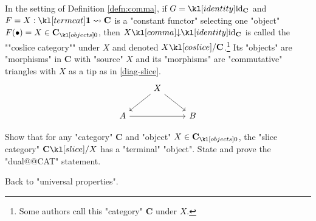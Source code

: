 \documentclass[main.tex]{subfiles}
\begin{document}
\begin{defn}
    In the setting of Definition \ref{defn:comma}, if $G = \id_{\mathbf{C}}$ and $F= X: \termcat \rightsquigarrow \mathbf{C}$ is a "constant functor" selecting one "object" $F(\bullet) = X \in \obj{\mathbf{C}}$, then $\comcat{X}{\id_{\mathbf{C}}}$ is called the ""coslice category"" under $X$ and denoted $\coslice{X}{\mathbf{C}}$.\footnote{Some authors call this "category" $\mathbf{C}$ under $X$.} Its "objects" are "morphisms" in $\mathbf{C}$ with "source" $X$ and its "morphisms" are "commutative" triangles with $X$ as a tip as in \eqref{diag-slice}.
    \begin{equation}\label{diag-slice}
        \begin{tikzcd}
            & X \arrow[ld] \arrow[rd] &\\
            A \arrow[rr]  & & B 
        \end{tikzcd}
    \end{equation}
\end{defn}
\begin{exer}\label{exer:universal:termslice}
    Show that for any "category" $\mathbf{C}$ and "object" $X \in \obj{\mathbf{C}}$, the "slice category" $\slice{\mathbf{C}}{X}$ has a "terminal" "object". State and prove the "dual@@CAT" statement.
\end{exer}
Back to "universal properties".
\end{document}

